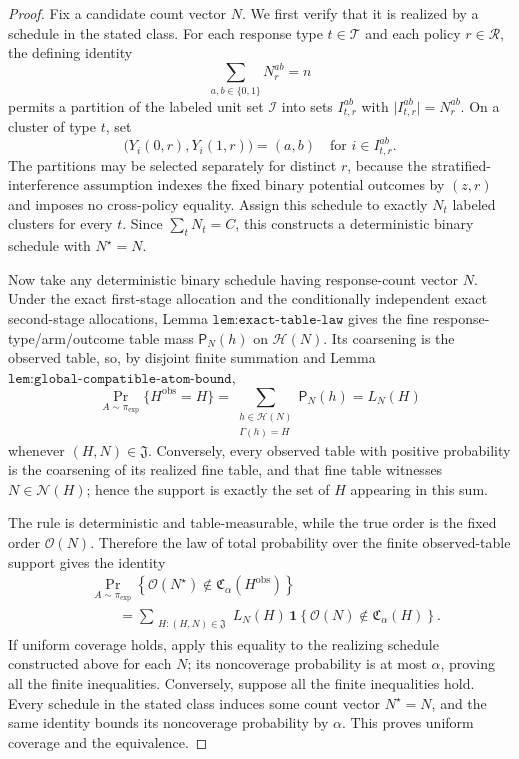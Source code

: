 \documentclass{article}
\begin{document}
\begin{proof}
Fix a candidate count vector \(N\). We first verify that it is realized by a schedule in the stated class. For each response type \(t\in\mathcal T\) and each policy \(r\in\mathcal R\), the defining identity
\[
 \sum_{a,b\in\{0,1\}}N_r^{ab}=n
\]
permits a partition of the labeled unit set \(\mathcal I\) into sets \(I_{t,r}^{ab}\) with \(\lvert I_{t,r}^{ab}\rvert=N_r^{ab}\). On a cluster of type \(t\), set
\[
 \bigl(Y_i(0,r),Y_i(1,r)\bigr)=(a,b)
 \quad\text{for }i\in I_{t,r}^{ab}.
\]
The partitions may be selected separately for distinct \(r\), because the stratified-interference assumption indexes the fixed binary potential outcomes by \((z,r)\) and imposes no cross-policy equality. Assign this schedule to exactly \(N_t\) labeled clusters for every \(t\). Since \(\sum_tN_t=C\), this constructs a deterministic binary schedule with \(N^\star=N\).

Now take any deterministic binary schedule having response-count vector \(N\). Under the exact first-stage allocation and the conditionally independent exact second-stage allocations, Lemma \(\texttt{lem:exact-table-law}\) gives the fine response-type/arm/outcome table mass \(\mathsf P_N(h)\) on \(\mathcal H(N)\). Its coarsening is the observed table, so, by disjoint finite summation and Lemma \(\texttt{lem:global-compatible-atom-bound}\),
\[
 \Pr_{A\sim\pi_{\exp}}\{H^{\mathrm{obs}}=H\}
 =\sum_{\substack{h\in\mathcal H(N)\\
                    \Gamma(h)=H}}\mathsf P_N(h)
 =L_N(H)
\]
whenever \((H,N)\in\mathfrak J\). Conversely, every observed table with positive probability is the coarsening of its realized fine table, and that fine table witnesses \(N\in\mathcal N(H)\); hence the support is exactly the set of \(H\) appearing in this sum.

The rule is deterministic and table-measurable, while the true order is the fixed order \(\mathcal O(N)\). Therefore the law of total probability over the finite observed-table support gives the identity
\[
\begin{aligned}
 &\Pr_{A\sim\pi_{\exp}}\!\left\{
 \mathcal O(N^\star)\notin
 \mathfrak C_\alpha(H^{\mathrm{obs}})\right\}\\
 &\qquad=
 \sum_{\substack{H:(H,N)\in\mathfrak J}}
 L_N(H)\,
 \mathbf 1\!\left\{\mathcal O(N)\notin
 \mathfrak C_\alpha(H)\right\}.
\end{aligned}
\]
If uniform coverage holds, apply this equality to the realizing schedule constructed above for each \(N\); its noncoverage probability is at most \(\alpha\), proving all the finite inequalities. Conversely, suppose all the finite inequalities hold. Every schedule in the stated class induces some count vector \(N^\star=N\), and the same identity bounds its noncoverage probability by \(\alpha\). This proves uniform coverage and the equivalence.
\end{proof}
\end{document}
